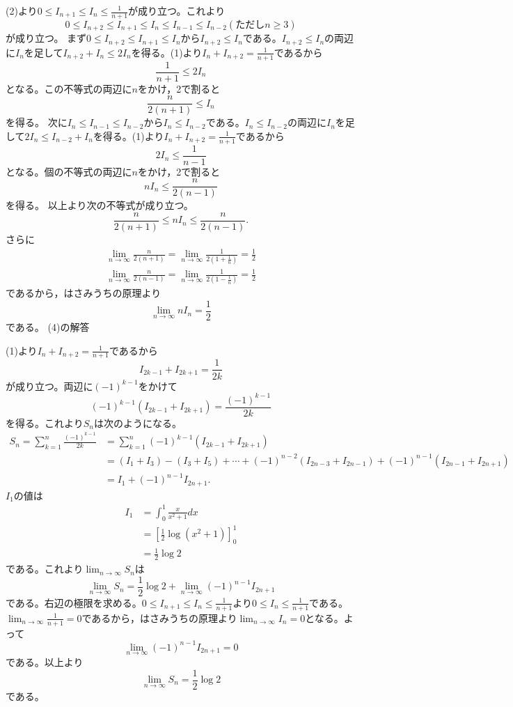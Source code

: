 \documentclass[11pt,a4paper]{jsarticle}
\begin{document}
(2)より$0 \leq I_{n+1} \leq I_{n} \leq \frac{1}{n+1}$が成り立つ。これより
\[0 \leq I_{n+2} \leq I_{n+1} \leq I_{n} \leq I_{n-1} \leq I_{n-2}(ただしn\geq 3)\]
が成り立つ。
まず$0 \leq I_{n+2} \leq I_{n+1} \leq I_{n}$から$I_{n+2}\leq I_{n}$である。$I_{n+2}\leq I_{n}$の両辺に$I_{n}$を足して$I_{n+2}+I_{n}\leq 2I_{n}$を得る。(1)より$I_{n}+I_{n+2}=\frac{1}{n+1}$であるから
\[\frac{1}{n+1} \leq 2 I_{n}\]
となる。この不等式の両辺に$n$をかけ，2で割ると
\[\frac{n}{2(n+1)} \leq I_{n}\]
を得る。
次に$I_{n} \leq I_{n-1} \leq I_{n-2}$から$I_{n}\leq I_{n-2}$である。$I_{n}\leq I_{n-2}$の両辺に$I_{n}$を足して$2I_{n}\leq I_{n-2}+I_{n}$を得る。(1)より$I_{n}+I_{n+2}=\frac{1}{n+1}$であるから
\[2 I_{n} \leq \frac{1}{n-1}\]
となる。個の不等式の両辺に$n$をかけ，2で割ると
\[n I_{n} \leq \frac{n}{2(n-1)}\]
を得る。
以上より次の不等式が成り立つ。
\[\frac{n}{2(n+1)} \leq n I_{n} \leq \frac{n}{2(n-1)}.\]
さらに
\[\begin{array}{l}
\lim _{n \rightarrow \infty} \frac{n}{2(n+1)}=\lim _{n \rightarrow \infty} \frac{1}{2\left(1+\frac{1}{n}\right)}=\frac{1}{2} \\
\lim _{n \rightarrow \infty} \frac{n}{2(n-1)}=\lim _{n \rightarrow \infty} \frac{1}{2\left(1-\frac{1}{n}\right)}=\frac{1}{2}
\end{array}\]
であるから，はさみうちの原理より
\[\lim _{n \rightarrow \infty} n I_{n}=\frac{1}{2}\]
である。
\noindent
(4)の解答

(1)より$I_{n}+I_{n+2}=\frac{1}{n+1}$であるから
\[I_{2k-1}+I_{2k+1}=\frac{1}{2k}\]
が成り立つ。両辺に$(-1)^{k-1}$をかけて
\[(-1)^{k-1}\left(I_{2 k-1}+I_{2 k+1}\right)=\frac{(-1)^{k-1}}{2 k}\]
を得る。これより$S_{n}$は次のようになる。
\[\begin{aligned}
S_{n}=\sum_{k=1}^{n} \frac{(-1)^{k-1}}{2 k} &=\sum_{k=1}^{n}(-1)^{k-1}\left(I_{2 k-1}+I_{2 k+1}\right) \\
&=\left(I_{1}+I_{3}\right)-\left(I_{3}+I_{5}\right)+\cdots+(-1)^{n-2}\left(I_{2 n-3}+I_{2 n-1}\right)+(-1)^{n-1}\left(I_{2 n-1}+I_{2 n+1}\right) \\
&=I_{1}+(-1)^{n-1} I_{2 n+1}.
\end{aligned}\]
$I_{1}$の値は
\[\begin{aligned}
I_{1} &=\int_{0}^{1} \frac{x}{x^{2}+1} d x \\
&=\left[\frac{1}{2} \log \left(x^{2}+1\right)\right]_{0}^{1} \\
&=\frac{1}{2} \log 2
\end{aligned}\]
である。これより$\displaystyle \lim _{n \rightarrow \infty} S_{n}$は
\[\lim _{n \rightarrow \infty} S_{n}=\frac{1}{2} \log 2+\lim _{n \rightarrow \infty}(-1)^{n-1} I_{2 n+1}\]
である。右辺の極限を求める。$0 \leq I_{n+1} \leq I_{n} \leq \frac{1}{n+1}$より$0 \leq I_{n} \leq \frac{1}{n+1}$である。$\lim _{n \rightarrow \infty} \frac{1}{n+1}=0$であるから，はさみうちの原理より$\displaystyle \lim _{n \rightarrow \infty} I_{n}=0$となる。よって
\[\lim _{n \rightarrow \infty}(-1)^{n-1} I_{2 n+1}=0\]
である。以上より
\[\lim _{n \rightarrow \infty} S_{n}=\frac{1}{2} \log 2\]
である。
\end{document}

